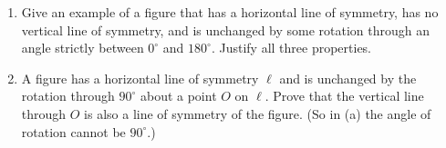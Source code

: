 \begin{enumerate}
\item[(a)] Give an example of a figure that has a horizontal line of symmetry, has no vertical line of symmetry, and is unchanged by some rotation through an angle strictly between $0^\circ$ and $180^\circ$. Justify all three properties.
\item[(b)] A figure has a horizontal line of symmetry $\ell$ and is unchanged by the rotation through $90^\circ$ about a point $O$ on $\ell$. Prove that the vertical line through $O$ is also a line of symmetry of the figure. (So in (a) the angle of rotation cannot be $90^\circ$.)
\end{enumerate}
